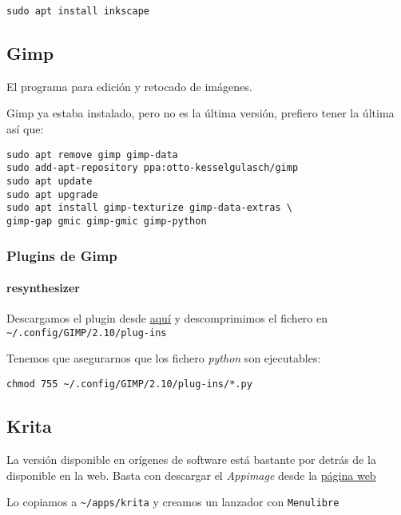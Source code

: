 \documentclass[
  12pt,
  spanish,
]{article}
\begin{document}
\begin{verbatim}
sudo apt install inkscape
\end{verbatim}

\hypertarget{gimp}{%
\subsection{Gimp}\label{gimp}}

El programa para edición y retocado de imágenes.

Gimp ya estaba instalado, pero no es la última versión, prefiero tener
la última así que:

\begin{verbatim}
sudo apt remove gimp gimp-data
sudo add-apt-repository ppa:otto-kesselgulasch/gimp
sudo apt update
sudo apt upgrade
sudo apt install gimp-texturize gimp-data-extras \
gimp-gap gmic gimp-gmic gimp-python
\end{verbatim}

\hypertarget{plugins-de-gimp}{%
\subsubsection{Plugins de Gimp}\label{plugins-de-gimp}}

\hypertarget{resynthesizer}{%
\paragraph{resynthesizer}\label{resynthesizer}}

Descargamos el plugin desde
\href{https://github.com/bootchk/resynthesizer}{aquí} y descomprimimos
el fichero en \texttt{\textasciitilde{}/.config/GIMP/2.10/plug-ins}

Tenemos que asegurarnos que los fichero \emph{python} son ejecutables:

\begin{verbatim}
chmod 755 ~/.config/GIMP/2.10/plug-ins/*.py
\end{verbatim}

\hypertarget{krita}{%
\subsection{Krita}\label{krita}}

La versión disponible en orígenes de software está bastante por detrás
de la disponible en la web. Basta con descargar el \emph{Appimage} desde
la \href{https://krita.org}{página web}

Lo copiamos a \texttt{\textasciitilde{}/apps/krita} y creamos un
lanzador con \texttt{Menulibre}
\end{document}
